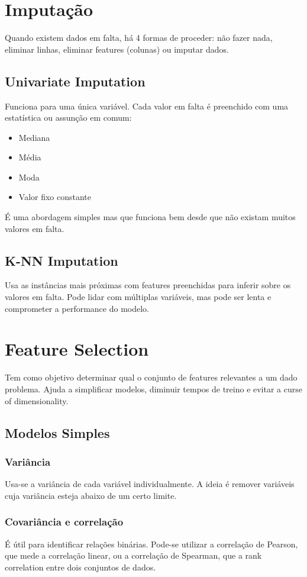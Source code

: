 \documentclass[10pt,a4paper]{report}
\begin{document}
\section{Imputação}
Quando existem dados em falta, há 4 formas de proceder: não fazer nada, eliminar linhas, eliminar features (colunas) ou imputar dados.
\subsection{Univariate Imputation}
Funciona para uma única variável. Cada valor em falta é preenchido com uma  estatística ou assunção em comum:
\begin{itemize}
\item Mediana
\item Média
\item Moda
\item Valor fixo constante
\end{itemize}
É uma abordagem simples mas que funciona bem desde que não existam muitos valores em falta.
\subsection{K-NN Imputation}
Usa as instâncias mais próximas com features preenchidas para inferir sobre os valores em falta. Pode lidar com múltiplas variáveis, mas pode ser lenta e comprometer a performance do modelo.
\section{Feature Selection}
Tem como objetivo determinar qual o conjunto de features relevantes a um dado problema. Ajuda a simplificar modelos, diminuir tempos de treino e evitar a curse of dimensionality.
\subsection{Modelos Simples}
\subsubsection{Variância}
Usa-se a variância de cada variável individualmente. A ideia é remover variáveis cuja variância esteja abaixo de um certo limite.
\subsubsection{Covariância e correlação}
É útil para identificar relações binárias. Pode-se utilizar a correlação de Pearson, que mede a correlação linear, ou a correlação de Spearman, que a rank correlation entre dois conjuntos de dados.
\end{document}
